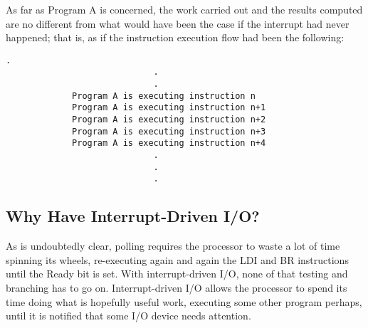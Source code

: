 \documentclass{patt}
\begin{document}
As far as Program A is concerned, the work carried out and the results
computed are no different from what would have been the case if the
interrupt had never happened; that is, as if the instruction execution
flow had been the following:

\begin{Verbatim}[fontsize=\fontsize{9}{10}\selectfont,formatcom=\color{seventyblack}]
                             .
                             .
                             .
             Program A is executing instruction n
             Program A is executing instruction n+1
             Program A is executing instruction n+2
             Program A is executing instruction n+3
             Program A is executing instruction n+4
                             .
                             .
                             .
\end{Verbatim}

\FloatBarrier
\subsection{Why Have Interrupt-Driven I/O?}

As is undoubtedly clear, polling requires the processor to waste a lot
of time spinning its wheels, re-executing again and again the LDI and
BR instructions until the Ready bit is set.  With interrupt-driven
I/O, none of that testing and branching has to go on.
Interrupt-driven I/O allows the processor to spend its time doing what
is hopefully useful work, executing some other program perhaps, until
it is notified that some I/O device needs attention.
\end{document}
